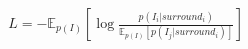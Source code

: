 \documentclass[10pt]{article}
\begin{document}
\begin{align*}L = -\mathbb{E}_{p(I)}\left[\log \frac{p(I_i|surround_i)}{\mathbb{E}_{p(I)}\left[p(I_j|surround_i)\right]}\right]\end{align*}
\end{document}
